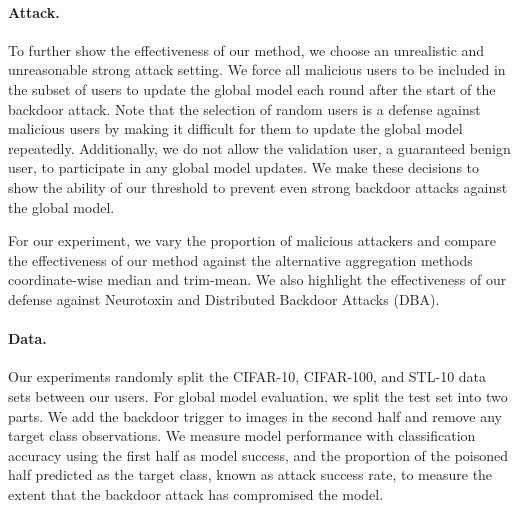 \documentclass{article} %
\begin{document}
\paragraph{Attack.} To further show the effectiveness of our method, we choose an unrealistic and unreasonable strong attack setting. We force all malicious users to be included in the subset of users to update the global model each round after the start of the backdoor attack. Note that the selection of random users is a defense against malicious users by making it difficult for them to update the global model repeatedly. Additionally, we do not allow the validation user, a guaranteed benign user, to participate in any global model updates. We make these decisions to show the ability of our threshold to prevent even strong backdoor attacks against the global model. 

For our experiment, we vary the proportion of malicious attackers and compare the effectiveness of our method against the alternative aggregation methods coordinate-wise median and trim-mean. We also highlight the effectiveness of our defense against Neurotoxin and Distributed Backdoor Attacks (DBA).


\paragraph{Data.} Our experiments randomly split the CIFAR-10, CIFAR-100, and STL-10 data sets between our users. For global model evaluation, we split the test set into two parts. We add the backdoor trigger to images in the second half and remove any target class observations. We measure model performance with classification accuracy using the first half as model success, and the proportion of the poisoned half predicted as the target class, known as attack success rate, to measure the extent that the backdoor attack has compromised the model.
\end{document}
